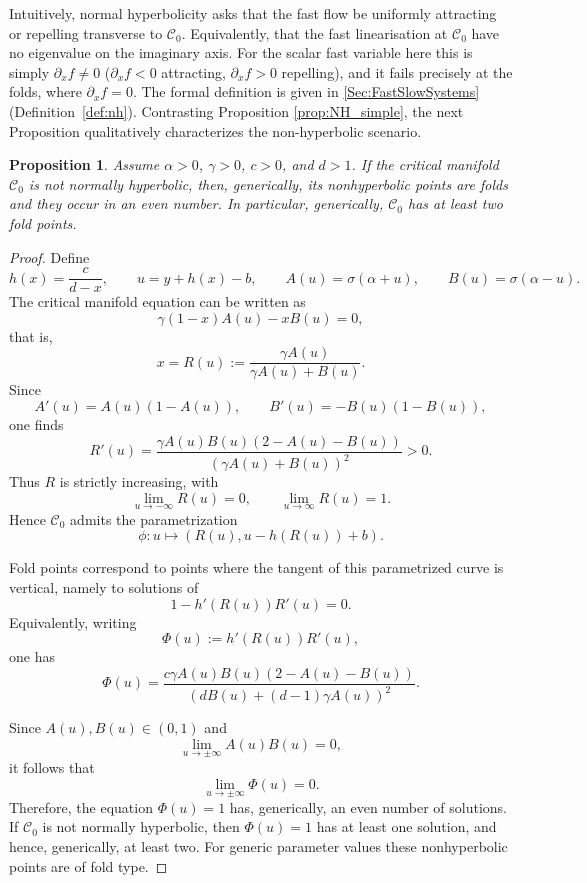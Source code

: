 \documentclass[3p]{elsarticle}
\theoremstyle{plain}
\newtheorem{proposition}{Proposition}[section]
\theoremstyle{remark}
\theoremstyle{definition}
\begin{document}
Intuitively, normal hyperbolicity asks that the fast flow be uniformly attracting
or repelling transverse to $\mathcal{C}_0$. Equivalently, that the fast
linearisation at $\mathcal{C}_0$ have no eigenvalue on the imaginary axis. For the scalar fast variable
here this is simply $\partial_x f\neq0$ ($\partial_x f<0$ attracting,
$\partial_x f>0$ repelling), and it fails precisely at the folds, where
$\partial_x f=0$. The formal definition is given in
\ref{Sec:FastSlowSystems} (Definition~\ref{def:nh}). Contrasting Proposition \ref{prop:NH_simple}, the next Proposition qualitatively characterizes the non-hyperbolic scenario.

\begin{proposition}\label{prop:fold_pairs}
Assume $\alpha>0$, $\gamma>0$, $c>0$, and $d>1$. If the critical manifold $\mathcal C_0$ is not normally hyperbolic, then, generically, its nonhyperbolic points are folds and they occur in an even number. In particular, generically, $\mathcal C_0$ has at least two fold points.
\end{proposition}

\begin{proof}
Define
\[
h(x)=\frac{c}{d-x},
\qquad
u=y+h(x)-b,
\qquad
A(u)=\sigma(\alpha+u),
\qquad
B(u)=\sigma(\alpha-u).
\]
The critical manifold equation can be written as
\[
\gamma(1-x)A(u)-xB(u)=0,
\]
that is,
\[
x=R(u):=\frac{\gamma A(u)}{\gamma A(u)+B(u)}.
\]
Since
\[
A'(u)=A(u)(1-A(u)),
\qquad
B'(u)=-B(u)(1-B(u)),
\]
one finds
\[
R'(u)=\frac{\gamma A(u)B(u)(2-A(u)-B(u))}{(\gamma A(u)+B(u))^2}>0.
\]
Thus $R$ is strictly increasing, with
\[
\lim_{u\to-\infty}R(u)=0,
\qquad
\lim_{u\to\infty}R(u)=1.
\]
Hence $\mathcal C_0$ admits the parametrization
\[
\phi:u\mapsto (R(u),u-h(R(u))+b).
\]

Fold points correspond to points where the tangent of this parametrized curve is vertical, namely to solutions of
\[
1-h'(R(u))R'(u)=0.
\]
Equivalently, writing
\[
\Phi(u):=h'(R(u))R'(u),
\]
one has
\begin{equation}\label{eq:Phi}
    \Phi(u)=\frac{c\gamma A(u)B(u)(2-A(u)-B(u))}{(dB(u)+(d-1)\gamma A(u))^2}.
\end{equation}

Since $A(u),B(u)\in(0,1)$ and
\[
\lim_{u\to\pm\infty}A(u)B(u)=0,
\]
it follows that
\[
\lim_{u\to\pm\infty}\Phi(u)=0.
\]
Therefore, the equation $\Phi(u)=1$ has, generically, an even number of solutions. If $\mathcal C_0$ is not normally hyperbolic, then $\Phi(u)=1$ has at least one solution, and hence, generically, at least two. For generic parameter values these nonhyperbolic points are of fold type.
\end{proof}
\end{document}
